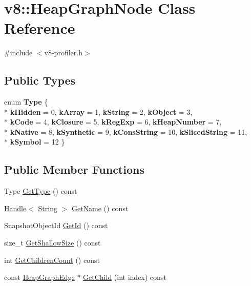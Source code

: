 \hypertarget{classv8_1_1_heap_graph_node}{}\section{v8\+:\+:Heap\+Graph\+Node Class Reference}
\label{classv8_1_1_heap_graph_node}


{\ttfamily \#include $<$v8-\/profiler.\+h$>$}

\subsection*{Public Types}
\begin{DoxyCompactItemize}
\item 
\hypertarget{classv8_1_1_heap_graph_node_ab674a58103a51abc56f99edc6a1479ed}{}enum {\bfseries Type} \{ \\*
{\bfseries k\+Hidden} = 0, 
{\bfseries k\+Array} = 1, 
{\bfseries k\+String} = 2, 
{\bfseries k\+Object} = 3, 
\\*
{\bfseries k\+Code} = 4, 
{\bfseries k\+Closure} = 5, 
{\bfseries k\+Reg\+Exp} = 6, 
{\bfseries k\+Heap\+Number} = 7, 
\\*
{\bfseries k\+Native} = 8, 
{\bfseries k\+Synthetic} = 9, 
{\bfseries k\+Cons\+String} = 10, 
{\bfseries k\+Sliced\+String} = 11, 
\\*
{\bfseries k\+Symbol} = 12
 \}\label{classv8_1_1_heap_graph_node_ab674a58103a51abc56f99edc6a1479ed}

\end{DoxyCompactItemize}
\subsection*{Public Member Functions}
\begin{DoxyCompactItemize}
\item 
Type \hyperlink{classv8_1_1_heap_graph_node_a5e07fc855bded52229e62b855fa08c5d}{Get\+Type} () const 
\item 
\hyperlink{classv8_1_1_local}{Handle}$<$ \hyperlink{classv8_1_1_string}{String} $>$ \hyperlink{classv8_1_1_heap_graph_node_af5f24ee6c07a57814e18bd317cb5576a}{Get\+Name} () const 
\item 
Snapshot\+Object\+Id \hyperlink{classv8_1_1_heap_graph_node_a0faf2a07888af9ca938b3ac089500b4c}{Get\+Id} () const 
\item 
size\+\_\+t \hyperlink{classv8_1_1_heap_graph_node_a5f6f1e87efce0b297c3ffad0b50f34d5}{Get\+Shallow\+Size} () const 
\item 
int \hyperlink{classv8_1_1_heap_graph_node_a0a49abe006755dd5536d15ae42f552d4}{Get\+Children\+Count} () const 
\item 
const \hyperlink{classv8_1_1_heap_graph_edge}{Heap\+Graph\+Edge} $\ast$ \hyperlink{classv8_1_1_heap_graph_node_ac3435611573e58b6614aeaab68442905}{Get\+Child} (int index) const 
\end{DoxyCompactItemize}


